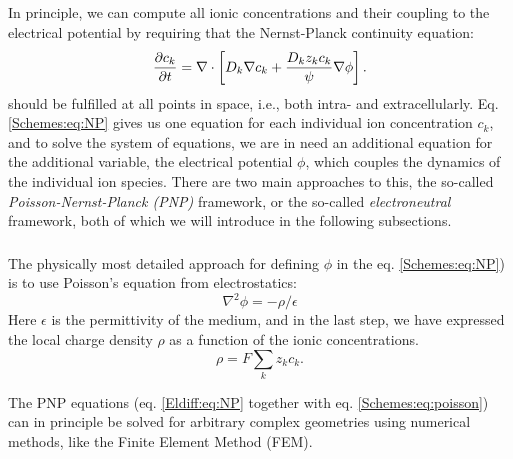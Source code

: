 

\subsection{}
\label{sec:Schemes:complete}
In principle, we can compute all ionic concentrations and their coupling to the electrical potential by requiring that the Nernst-Planck continuity equation:
\begin{equation}
\frac{\partial c_k}{\partial t} = {\bf \nabla} \cdot \left[{D_k} {\bf \nabla} c_k + \frac{D_k z_k c_k}{\psi} {\bf \nabla} \phi \right].
\label{Schemes:eq:NP}
\end{equation}
should be fulfilled at all points in space, i.e., both intra- and extracellularly. Eq. \ref{Schemes:eq:NP} gives us one equation for each individual ion concentration $c_k$, and to solve the system of equations, we are in need an additional equation for the additional variable, the electrical potential $\phi$, which couples the dynamics of the individual ion species. There are two main approaches to this, the so-called \textit{Poisson-Nernst-Planck (PNP)} framework, or the so-called \textit{electroneutral} framework, both of which we will introduce in the following subsections. 


\subsubsection{}
\label{sec:Schemes:PNP}
The physically most detailed approach for defining $\phi$ in the eq. \ref{Schemes:eq:NP}) is to use Poisson's equation from electrostatics:
\begin{equation}
\nabla^2 \phi = -\rho/\epsilon
\label{Schemes:eq:poisson}
\end{equation}
Here $\epsilon$ is the permittivity of the medium, and in the last step, we have expressed the local charge density $\rho$ as a function of the ionic concentrations. 
\begin{equation}
\rho = F\sum_k z_k c_k.
\label{Schemes:eq:PNPrho}
\end{equation}

The PNP equations (eq. \ref{Eldiff:eq:NP} together with eq. \ref{Schemes:eq:poisson}) can in principle be solved for arbitrary complex geometries using numerical methods, like the Finite Element Method (FEM). 

